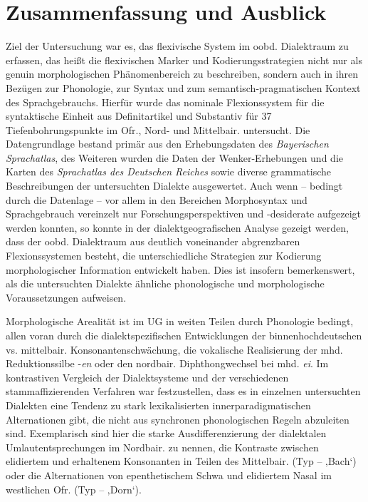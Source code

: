 \chapter{Zusammenfassung und Ausblick}
\label{chap:11}
Ziel der Untersuchung war es, das flexivische System im oobd. Dialektraum zu erfassen, das heißt die flexivischen Marker und Kodierungsstrategien nicht nur als genuin morphologischen Phänomenbereich zu beschreiben, sondern auch in ihren Bezügen zur Phonologie, zur Syntax und zum semantisch-pragmatischen Kontext des Sprachgebrauchs. Hierfür wurde das nominale Flexionssystem für die syntaktische Einheit aus Definitartikel und Substantiv für 37 Tiefenbohrungspunkte im Ofr., Nord- und Mittelbair. untersucht. Die Datengrundlage bestand primär aus den Erhebungsdaten des \textit{Bayerischen Sprachatlas}, des Weiteren wurden die Daten der Wenker-Erhebungen und die Karten des \textit{Sprachatlas des Deutschen Reiches} sowie diverse grammatische Beschreibungen der untersuchten Dialekte ausgewertet. Auch wenn -- bedingt durch die Datenlage -- vor allem in den Bereichen Morphosyntax und Sprachgebrauch vereinzelt nur Forschungsperspektiven und -desiderate aufgezeigt werden konnten, so konnte in der dialektgeografischen Analyse gezeigt werden, dass der oobd. Dialektraum aus deutlich voneinander abgrenzbaren Flexionssystemen besteht, die unterschiedliche Strategien zur Kodierung morphologischer Information entwickelt haben. Dies ist insofern bemerkenswert, als die untersuchten Dialekte ähnliche phonologische und morphologische Voraussetzungen aufweisen.

Morphologische Arealität ist im UG in weiten Teilen durch Phonologie bedingt, allen voran durch die dialektspezifischen Entwicklungen der binnenhochdeutschen vs. mittelbair. Konsonantenschwächung, die vokalische Realisierung der mhd. Reduktionssilbe -\textit{en} oder den nordbair. Diphthongwechsel bei mhd. \textit{ei}. Im kontrastiven Vergleich der Dialektsysteme und der verschiedenen stammaffizierenden Verfahren war festzustellen, dass es in einzelnen untersuchten Dialekten eine Tendenz zu stark lexikalisierten innerparadigmatischen Alternationen gibt, die nicht aus synchronen phonologischen Regeln abzuleiten sind. Exemplarisch sind hier die starke Ausdifferenzierung der dialektalen Umlautentsprechungen im Nordbair. zu nennen, die Kontraste zwischen elidiertem und erhaltenem Konsonanten in Teilen des Mittelbair. (Typ  --  ‚Bach‘) oder die Alternationen von epenthetischem Schwa und elidiertem Nasal im westlichen Ofr. (Typ  --  ‚Dorn‘).

